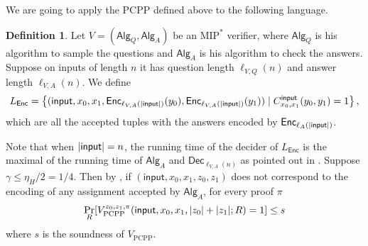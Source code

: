\documentclass[10pt,a4paper]{article}
\theoremstyle{plain}
\theoremstyle{definition}
\newtheorem{definition}[theorem]{Definition}
\newcommand {\set} [1] {\ensuremath{ \left\lbrace #1 \right\rbrace }}
\DeclarePairedDelimiter{\abs}{\lvert}{\rvert}
\newcommand{\1}{\mathbb{1}} %
\newcommand{\PCPP}{\mathrm{PCPP}}
\newcommand{\ipt}{\mathsf{input}}
\newcommand{\Enc}{\mathsf{Enc}}
\newcommand{\Dec}{\mathsf{Dec}}
\newcommand{\Alg}{\mathsf{Alg}}
\newcommand{\MIP}{\mathrm{MIP}}
\begin{document}
We are going to apply the $\PCPP$ defined above to the following language.
\begin{definition}
    \label{def:L_enc}
    Let $V = (\Alg_Q, \Alg_A)$ be an $\MIP^\ast$ verifier, where $\Alg_Q$ is his algorithm to sample the questions and $\Alg_A$ is his algorithm to check the answers.
    Suppose on inputs of length $n$ it has question length $\ell_{V,Q}(n)$ and answer length $\ell_{V,A}(n)$.
    We define 
    \begin{align*}
        L_{\Enc} = \set{ (\ipt, x_0, x_1, \Enc_{\ell_{V,A}(\abs{\ipt})}(y_0), \Enc_{\ell_{V,A}(\abs{\ipt})}(y_1) ) 
        \mid C^{\ipt}_{x_0,x_1}(y_0,y_1) = 1
        },
    \end{align*}
    which are all the accepted tuples with the answers encoded by $\Enc_{\ell_A(\abs{\ipt})}$.
\end{definition}
Note that when $\abs{\ipt} = n$, the running time of the decider of $L_{\Enc}$ is the maximal of the running time of $\Alg_A$ and $\Dec_{\ell_{V,A}(n)}$ as pointed out in \cite[Proposition 17.7]{neexp}.
Suppose $\gamma \leq \eta_H/2 = 1/4$. 
Then by \cite[Proposition 17.8]{neexp}, if $(\ipt, x_0, x_1, z_0, z_1)$ does not correspond to 
the encoding of any assignment accepted by $\Alg_A$, for every proof $\pi$
\begin{align*}
    \Pr_R[V_{\PCPP}^{z_0,z_1,\pi}(\ipt, x_0,x_1, \abs{z_0} + \abs{z_1};R) = 1 ] \leq s
\end{align*}
where $s$ is the soundness of $V_{\PCPP}$.
\end{document}
